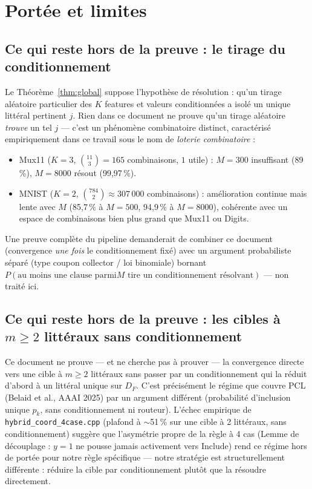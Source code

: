\documentclass[12pt,a4paper]{article}
\theoremstyle{remark}
\newcommand{\Inc}{\ensuremath{\mathrm{Include}}}
\newcommand{\DF}{D_F}
\begin{document}
\section{Portée et limites}\label{sec:portee}

\subsection{Ce qui reste hors de la preuve : le tirage du conditionnement}

Le Théorème~\ref{thm:global} suppose l'hypothèse de résolution : qu'un tirage
aléatoire particulier des $K$ features et valeurs conditionnées a isolé un unique
littéral pertinent $j$. Rien dans ce document ne prouve qu'un tirage aléatoire
\emph{trouve} un tel $j$ --- c'est un phénomène combinatoire distinct, caractérisé
empiriquement dans ce travail sous le nom de \emph{loterie combinatoire} :
\begin{itemize}
  \item Mux11 ($K=3$, $\binom{11}{3}=165$ combinaisons, $1$ utile) : $M=300$
  insuffisant (89\,\%), $M=8000$ résout (99,97\,\%).
  \item MNIST ($K=2$, $\binom{784}{2}\approx 307\,000$ combinaisons) : amélioration
  continue mais lente avec $M$ (85,7\,\% à $M{=}500$, 94,9\,\% à $M{=}8000$),
  cohérente avec un espace de combinaisons bien plus grand que Mux11 ou Digits.
\end{itemize}
Une preuve complète du pipeline demanderait de combiner ce document (convergence
\emph{une fois} le conditionnement fixé) avec un argument probabiliste séparé
(type coupon collector / loi binomiale) bornant $P(\text{au moins une clause parmi
$M$ tire un conditionnement résolvant})$ --- non traité ici.

\subsection{Ce qui reste hors de la preuve : les cibles à $m\ge2$ littéraux sans conditionnement}

Ce document ne prouve --- et ne cherche pas à prouver --- la convergence directe
vers une cible à $m\ge2$ littéraux sans passer par un conditionnement qui la
réduit d'abord à un littéral unique sur $\DF$. C'est précisément le régime que
couvre PCL (Belaid et al., AAAI 2025) par un argument différent (probabilité
d'inclusion unique $p_k$, sans conditionnement ni routeur). L'échec empirique de
\texttt{hybrid\_coord\_4case.cpp} (plafond à $\sim$51\,\% sur une cible à 2
littéraux, sans conditionnement) suggère que l'asymétrie propre de la règle à 4
cas (Lemme de découplage : $y=1$ ne pousse jamais activement vers \Inc) rend ce
régime hors de portée pour notre règle spécifique --- notre stratégie est
structurellement différente : réduire la cible par conditionnement plutôt que
la résoudre directement.
\end{document}
